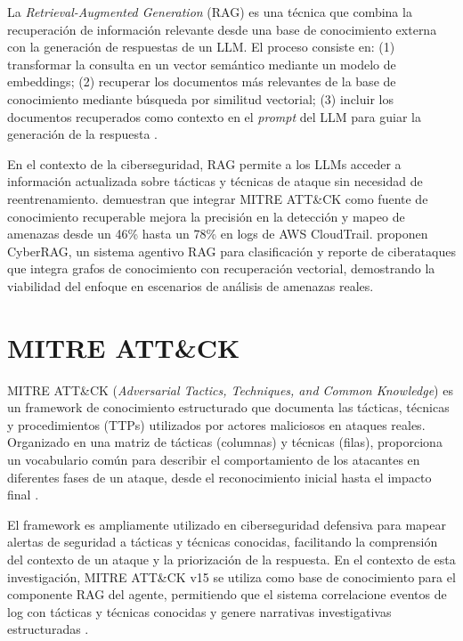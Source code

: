 La \textit{Retrieval-Augmented Generation} (RAG) es una técnica que combina la recuperación de información relevante desde una base de conocimiento externa con la generación de respuestas de un LLM. El proceso consiste en: (1) transformar la consulta en un vector semántico mediante un modelo de embeddings; (2) recuperar los documentos más relevantes de la base de conocimiento mediante búsqueda por similitud vectorial; (3) incluir los documentos recuperados como contexto en el \textit{prompt} del LLM para guiar la generación de la respuesta \cite{blefari2026cyberrag}.

En el contexto de la ciberseguridad, RAG permite a los LLMs acceder a información actualizada sobre tácticas y técnicas de ataque sin necesidad de reentrenamiento. \cite{singh2026cloudtrail} demuestran que integrar MITRE ATT\&CK como fuente de conocimiento recuperable mejora la precisión en la detección y mapeo de amenazas desde un 46\% hasta un 78\% en logs de AWS CloudTrail. \cite{blefari2026cyberrag} proponen CyberRAG, un sistema agentivo RAG para clasificación y reporte de ciberataques que integra grafos de conocimiento con recuperación vectorial, demostrando la viabilidad del enfoque en escenarios de análisis de amenazas reales.

\section{MITRE ATT\&CK}

MITRE ATT\&CK (\textit{Adversarial Tactics, Techniques, and Common Knowledge}) es un framework de conocimiento estructurado que documenta las tácticas, técnicas y procedimientos (TTPs) utilizados por actores maliciosos en ataques reales. Organizado en una matriz de tácticas (columnas) y técnicas (filas), proporciona un vocabulario común para describir el comportamiento de los atacantes en diferentes fases de un ataque, desde el reconocimiento inicial hasta el impacto final \cite{oduola2025wazuh}.

El framework es ampliamente utilizado en ciberseguridad defensiva para mapear alertas de seguridad a tácticas y técnicas conocidas, facilitando la comprensión del contexto de un ataque y la priorización de la respuesta. En el contexto de esta investigación, MITRE ATT\&CK v15 se utiliza como base de conocimiento para el componente RAG del agente, permitiendo que el sistema correlacione eventos de log con tácticas y técnicas conocidas y genere narrativas investigativas estructuradas \cite{singh2026cloudtrail, liu2026ctithinker}.

